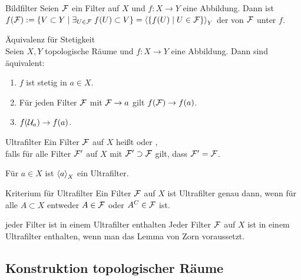 \begin{Def}{Bildfilter}
    Seien $\mathcal{F}$ ein Filter auf $X$ und $f\colon X \rightarrow Y$ eine
    Abbildung.
    Dann ist \\
    $f(\mathcal{F}) := \{V \subset Y \;|\;
    \exists_{U \in \mathcal{F}}\; f(U) \subset V\} =
    \left\langle{\{f(U) \;|\; U \in \ensuremath{\mathcal{F}}\}}\right\rangle_Y$
    der  von $\mathcal{F}$ unter $f$.
\end{Def}

\begin{Satz}{Äquivalenz für Stetigkeit}\\
    Seien $X, Y$ topologische Räume und $f\colon X \rightarrow Y$ eine
    Abbildung.
    Dann sind äquivalent:
    \begin{enumerate}
        \item
        $f$ ist stetig in $a \in X$.
        
        \item
        Für jeden Filter $\mathcal{F}$ mit $\mathcal{F} \to a$ gilt $f(\mathcal{F}) \to f(a)$.
        
        \item
        $f(\mathcal{U}_a) \to f(a)$.
    \end{enumerate}
\end{Satz}

\linie

\begin{Def}{Ultrafilter}
    Ein Filter $\mathcal{F}$ auf $X$ heißt  oder
    , \\
    falls für alle Filter $\mathcal{F}'$ auf $X$ mit $\mathcal{F}' \supset \mathcal{F}$ gilt,
    dass $\mathcal{F}' = \mathcal{F}$.
\end{Def}

\begin{Bsp}
    Für $a \in X$ ist $\left\langle{a}\right\rangle_X$ ein Ultrafilter.
\end{Bsp}

\begin{Satz}{Kriterium für Ultrafilter}
    Ein Filter $\mathcal{F}$ auf $X$ ist Ultrafilter genau dann, wenn für alle
    $A \subset X$ entweder $A \in \mathcal{F}$ oder $A^C \in \mathcal{F}$ ist.
\end{Satz}

\begin{Satz}{jeder Filter ist in einem Ultrafilter enthalten}
    Jeder Filter $\mathcal{F}$ auf $X$ ist in einem Ultrafilter enthalten,
    wenn man das Lemma von Zorn voraussetzt.
\end{Satz}

\pagebreak

\subsection{%
    Konstruktion topologischer Räume%
}

